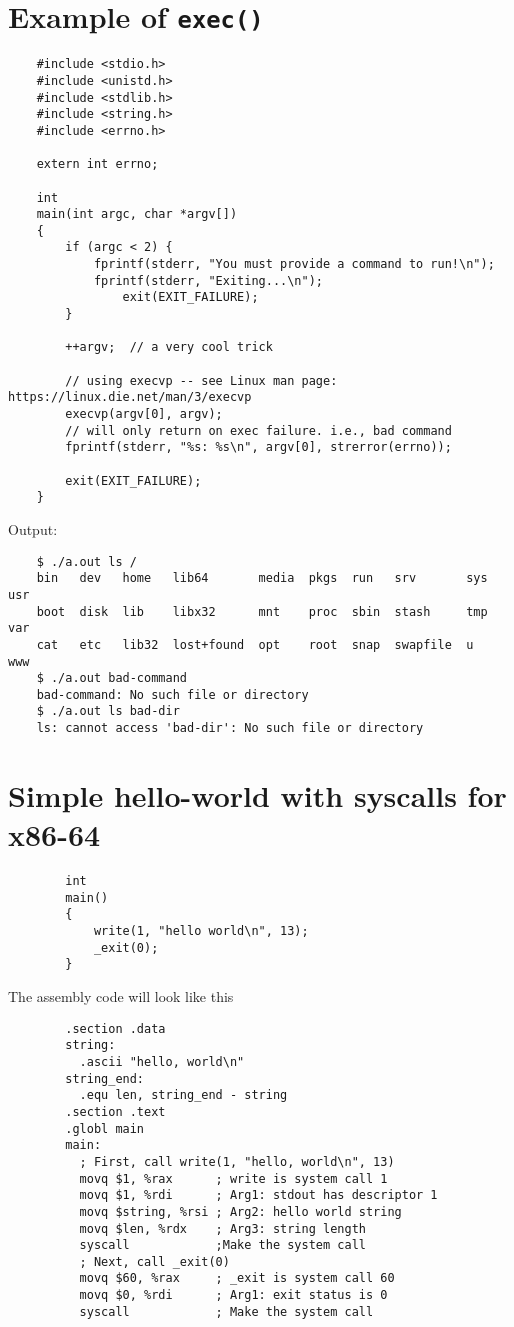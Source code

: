 \documentclass[12pt,letterpaper]{article}
\begin{document}
	\section{Example of {\tt exec()}}
	\begin{verbatim}
	#include <stdio.h>
	#include <unistd.h>
	#include <stdlib.h>
	#include <string.h>
	#include <errno.h>
		
	extern int errno;
		
	int
	main(int argc, char *argv[])
	{
	    if (argc < 2) {
	        fprintf(stderr, "You must provide a command to run!\n");
	        fprintf(stderr, "Exiting...\n");
	            exit(EXIT_FAILURE);
	    }
			
	    ++argv;  // a very cool trick
			
	    // using execvp -- see Linux man page: https://linux.die.net/man/3/execvp
	    execvp(argv[0], argv);
	    // will only return on exec failure. i.e., bad command
	    fprintf(stderr, "%s: %s\n", argv[0], strerror(errno));
			
	    exit(EXIT_FAILURE);
	}
	\end{verbatim}
	\noindent Output:
	\begin{verbatim}
	$ ./a.out ls /
	bin   dev   home   lib64       media  pkgs  run   srv       sys  usr
	boot  disk  lib    libx32      mnt    proc  sbin  stash     tmp  var
	cat   etc   lib32  lost+found  opt    root  snap  swapfile  u    www
	$ ./a.out bad-command
	bad-command: No such file or directory
	$ ./a.out ls bad-dir
	ls: cannot access 'bad-dir': No such file or directory
	\end{verbatim}
	


	\section{Simple hello-world with syscalls for x86-64}
	\begin{verbatim}
		int
		main()
		{
			write(1, "hello world\n", 13);
			_exit(0);
		}
	\end{verbatim}
	
	The assembly code will look like this
	\begin{verbatim}
		.section .data
		string:
		  .ascii "hello, world\n"
		string_end:
		  .equ len, string_end - string
		.section .text
		.globl main
		main:
		  ; First, call write(1, "hello, world\n", 13)
		  movq $1, %rax      ; write is system call 1
		  movq $1, %rdi      ; Arg1: stdout has descriptor 1
		  movq $string, %rsi ; Arg2: hello world string
		  movq $len, %rdx    ; Arg3: string length
		  syscall            ;Make the system call
		  ; Next, call _exit(0)
		  movq $60, %rax     ; _exit is system call 60
		  movq $0, %rdi      ; Arg1: exit status is 0
		  syscall            ; Make the system call
	\end{verbatim}
\end{document}
